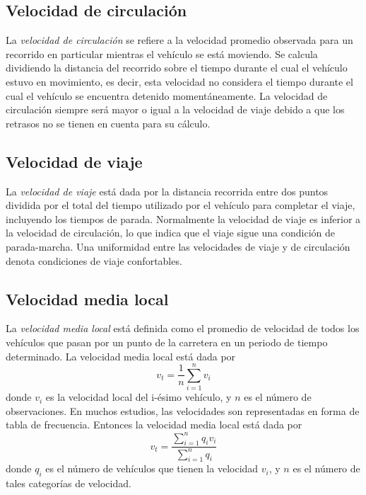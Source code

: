 \subsection{Velocidad de circulación}

La \emph{velocidad de circulación} se refiere a la velocidad promedio observada para un recorrido en particular mientras el vehículo se está moviendo. Se calcula dividiendo la distancia del recorrido sobre el tiempo durante el cual el vehículo estuvo en movimiento, es decir, esta velocidad no considera el tiempo durante el cual el vehículo se encuentra detenido momentáneamente. La velocidad de circulación siempre será mayor o igual a la velocidad de viaje debido a que los retrasos no se tienen en cuenta para su cálculo.

\subsection{Velocidad de viaje}

La \emph{velocidad de viaje} está dada por la distancia recorrida entre dos puntos dividida por el total del tiempo utilizado por el vehículo para completar el viaje, incluyendo los tiempos de parada. Normalmente la velocidad de viaje es inferior a la velocidad de circulación, lo que indica que el viaje sigue una condición de parada-marcha. Una uniformidad entre las velocidades de viaje y de circulación denota condiciones de viaje confortables.

\subsection{Velocidad media local}

La \emph{velocidad media local} está definida como el promedio de velocidad de todos los vehículos que pasan por un punto de la carretera en un periodo de tiempo determinado. La velocidad media local está dada por
\begin{equation}
{ v }_{ t }=\frac { 1 }{ n } \sum _{ i=1 }^{ n }{ { v }_{ i } }
\end{equation}
donde $v_{i}$ es la velocidad local del i-ésimo vehículo, y $n$ es el número de observaciones. En  muchos estudios, las velocidades son representadas en forma de tabla de frecuencia. Entonces la velocidad media local está dada por
\begin{equation}
{ v }_{ t }=\frac { \sum _{ i=1 }^{ n }{ { q }_{ i }{ v }_{ i } }  }{ \sum _{ i=1 }^{ n }{ { q }_{ i } }  } 
\end{equation}
donde $q_{i}$ es el número de vehículos que tienen la velocidad $v_{i}$, y $n$ es el número de tales categorías de velocidad.

